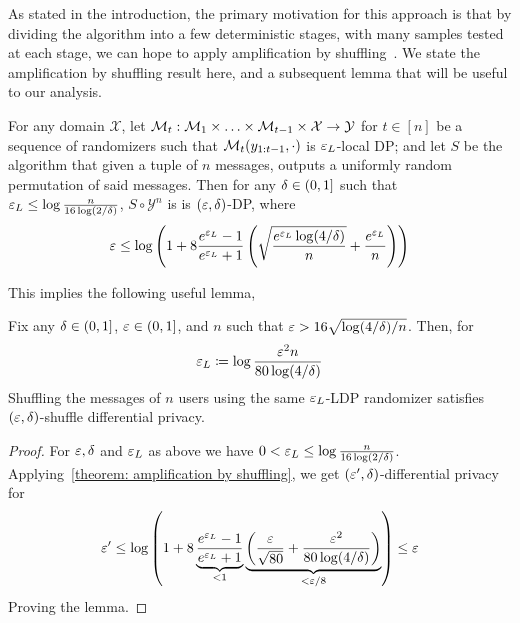 As stated in the introduction, the primary motivation for this approach is that by dividing the algorithm into a few deterministic stages, with many samples tested at each stage, we can hope to apply amplification by shuffling~\cite{feldman21shuffle}. We state the amplification by shuffling result here, and a subsequent lemma that will be useful to our analysis.
\begin{theorem}
    \label{theorem: amplification by shuffling}
    For any domain $\mathcal{X}$, let $\mathcal{M}_t:\mathcal{M}_1\times\ldots\times\mathcal{M}_{t-1}\times\mathcal{X}\rightarrow\mathcal{Y}$  for $t\in [n]$ be a sequence of randomizers such that $\mathcal{M}_t(y_{1:t-1},\cdot)$ is $\varepsilon_L$-local DP; and let $S$ be the algorithm that given a tuple of $n$ messages, outputs a uniformly random permutation of said messages. Then for any $\delta\in(0,1]$ such that $\varepsilon_L\leq\log\frac{n}{16\log(2/\delta)}$, $S\circ \mathcal{Y}^n$ is is $(\varepsilon,\delta)$-DP, where
    \[
    \varepsilon\leq\log\left(1 + 8\frac{e^{\varepsilon_L}-1}{e^{\varepsilon_L}+1}\left(\sqrt{\frac{e^{\varepsilon_L}\log(4/\delta)}{n}}+
\frac{e^{\varepsilon_L}}{n}\right)\right)
    \]
\end{theorem}
This implies the following useful lemma,
\begin{lemma}
\label{lemma: amplification by shuffling}
    Fix any $\delta\in(0,1]$, $\varepsilon\in(0,1]$, and $n$ such that $\varepsilon>16\sqrt{\log(4/\delta)/n}$. Then, for
    \[
    \varepsilon_L\coloneqq\log\frac{\varepsilon^2 n}{80\log(4/\delta)}
    \]
    Shuffling the messages of $n$ users using the same $\varepsilon_L$-LDP randomizer satisfies $(\varepsilon,\delta)$-shuffle differential privacy.
\end{lemma}
\begin{proof}
    For $\varepsilon,\delta$ and $\varepsilon_L$ as above we have $0<\varepsilon_L\leq\log\frac{n}{16\log(2/\delta)}$. Applying~\autoref{theorem: amplification by shuffling}, we get $(\varepsilon',\delta)$-differential privacy for
    \[
    \varepsilon' \leq \log\left(1 + 8\underbrace{\frac{e^{\varepsilon_L}-1}{e^{\varepsilon_L} + 1}}_{<1}\underbrace{\left(\frac{\varepsilon}{\sqrt{80}}+\frac{\varepsilon^2}{80\log(4/\delta)}\right)}_{< \varepsilon/8}\right)\leq \varepsilon
    \]
    Proving the lemma.
\end{proof}

